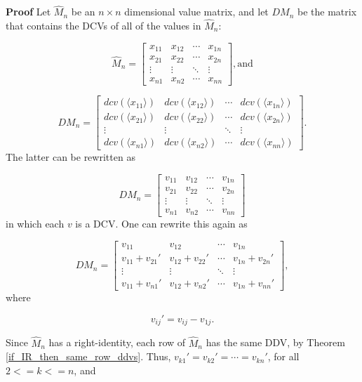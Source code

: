 \documentclass[10pt,letterpaper]{article}
\newenvironment{proof}{\noindent\textbf{Proof} }{\qed \newline}
\newcommand{\qed}{\nobreak \ifvmode \relax \else
      \ifdim\lastskip<1.5em \hskip-\lastskip
      \hskip1.5em plus0em minus0.5em \fi \nobreak
      \vrule height0.75em width0.5em depth0.25em\fi}
\numberwithin{equation}{section}
\begin{document}
\begin{proof}Let $\hat M_n$ be an $n \times n$ dimensional value
  matrix, and let $DM_n$ be the matrix that contains the DCVs of all
  of the values in $\hat M_n$:

\[ \hat M_n = \left[ \begin{matrix} 
  x_{11} & x_{12} & \cdots & x_{1n} \\
  x_{21} & x_{22} & \cdots & x_{2n} \\
  \vdots & \vdots & \ddots & \vdots \\
  x_{n1} & x_{n2} & \cdots & x_{nn}
 \end{matrix} \right] , \mbox{and} \]

\[ DM_n = \left[ \begin{matrix}
    dcv(\langle x_{11} \rangle) & dcv(\langle x_{12} \rangle) & \cdots & dcv(\langle x_{1n} \rangle) \\
    dcv(\langle x_{21} \rangle) & dcv(\langle x_{22} \rangle) & \cdots & dcv(\langle x_{2n} \rangle) \\
    \vdots & \vdots & \ddots & \vdots \\
    dcv(\langle x_{n1} \rangle) & dcv(\langle x_{n2} \rangle) & \cdots
    & dcv(\langle x_{nn} \rangle)
 \end{matrix} \right] . \] The latter can be rewritten as

\[ DM_n = \left[ \begin{matrix} 
  v_{11} & v_{12} & \cdots & v_{1n} \\
  v_{21} & v_{22} & \cdots & v_{2n} \\
  \vdots & \vdots & \ddots & \vdots \\
  v_{n1} & v_{n2} & \cdots & v_{nn}
\end{matrix} \right] \] in which each $v$ is a DCV.  One can rewrite
this again as

\[ DM_n = \left[ \begin{matrix} 
  v_{11} & v_{12} & \cdots & v_{1n} \\
  v_{11} + v_{21} \prime & v_{12} + v_{22} \prime & \cdots & v_{1n} + v_{2n} \prime \\
  \vdots & \vdots & \ddots & \vdots \\
  v_{11} + v_{n1} \prime & v_{12} + v_{n2} \prime & \cdots & v_{1n} + v_{nn} \prime
 \end{matrix} \right] , \] where

\[ v_{ij} \prime = v_{ij} - v_{1j} . \]

Since $\hat M_n$ has a right-identity, each row of $\hat M_n$ has
the same DDV, by Theorem \ref{if_IR_then_same_row_ddvs}.  Thus,
$v_{k1} \prime = v_{k2} \prime = \cdots = v_{kn} \prime$, for all $2 <= k <=
n$, and


\end{proof}
\end{document}
